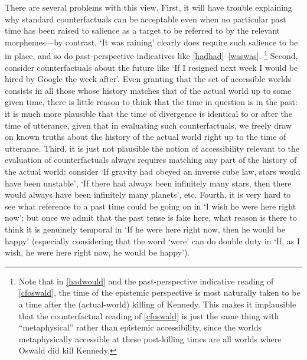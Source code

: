 \documentclass[If.tex]{subfiles}
\begin{document}
There are several problems with this view. First, it will have trouble explaining why standard counterfactuals can be acceptable even when no particular past time has been raised to salience as a target to be referred to by the relevant morphemes---by contrast, ‘It was raining’ clearly does require such salience to be in place, and so do past-perspective indicatives like \ref{hadhad}--\ref{waswas}.%
\footnote{Note that in \ref{hadwould} and the past-perspective indicative reading of \ref{cfoswald}, the time of the epistemic perspective is most naturally taken to be a time after the (actual-world) killing of Kennedy. This makes it implausible that the counterfactual reading of \ref{cfoswald} is just the same thing with “metaphysical” rather than epistemic accessibility, since the worlds metaphysically accessible at these post-killing times are all worlds where Oswald did kill Kennedy.}
Second, consider counterfactuals about the future like ‘If I resigned next week I would be hired by Google the week after’. Even granting that the set of accessible worlds consists in all those whose history matches that of the actual world up to some given time, there is little reason to think that the time in question is in the past: it is much more plausible that the time of divergence is identical to or after the time of utterance, given that in evaluating such counterfactuals, we freely draw on known truths about the history of the actual world right up to the time of utterance. Third, it is just not plausible the notion of accessibility relevant to the evaluation of counterfactuals always requires matching any part of the history of the actual world: consider ‘If gravity had obeyed an inverse cube law, stars would have been unstable’, ‘If there had always been infinitely many stars, then there would always have been infinitely many planets’, etc. Fourth, it is very hard to see what reference to a past time could be going on in ‘I wish he were here right now’; but once we admit that the past tense is fake here, what reason is there to think it is genuinely temporal in ‘If he were here right now, then he would be happy’ (especially considering that the word ‘were’ can do double duty in ‘If, as I wish, he were here right now, he would be happy’).%
\end{document}
